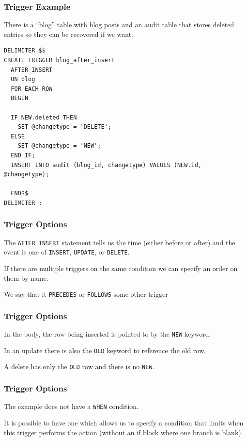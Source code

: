 \begin{frame}[fragile]
\frametitle{Trigger Example}

There is a ``blog'' table with blog posts and an audit table that stores deleted entries so they can be recovered if we want.

{\small
\begin{verbatim}
DELIMITER $$
CREATE TRIGGER blog_after_insert 
  AFTER INSERT 
  ON blog
  FOR EACH ROW 
  BEGIN
  
  IF NEW.deleted THEN
    SET @changetype = 'DELETE';
  ELSE
    SET @changetype = 'NEW';
  END IF;  
  INSERT INTO audit (blog_id, changetype) VALUES (NEW.id, @changetype);
		
  END$$
DELIMITER ;
\end{verbatim}
}



\end{frame}


\begin{frame}
\frametitle{Trigger Options}

The \texttt{AFTER INSERT} statement tells us the time (either before or after) and the event is one of \texttt{INSERT}, \texttt{UPDATE}, or \texttt{DELETE}.


If there are multiple triggers on the same condition we can specify an order on them by name. 

We say that it \texttt{PRECEDES} or \texttt{FOLLOWS} some other trigger

\end{frame}

\begin{frame}
\frametitle{Trigger Options}

In the body, the row being inserted is pointed to by the \texttt{NEW} keyword. 

In an update there is also the \texttt{OLD} keyword to reference the old row. 

A delete has only the \texttt{OLD} row and there is no \texttt{NEW}.


\end{frame}

\begin{frame}
\frametitle{Trigger Options}

The example does not have a \texttt{WHEN} condition. 

It is possible to have one which allows us to specify a condition that limits when this trigger performs the action (without an if block where one branch is blank). 



\end{frame}







